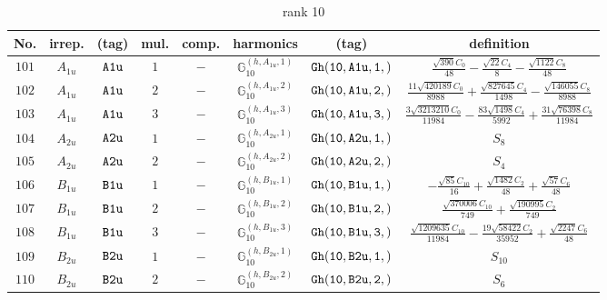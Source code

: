\documentclass[fleqn,8pt]{jsarticle}
\begin{document}
\begin{table}[ht!]
\begin{center}
\caption{rank 10}
\renewcommand{\arraystretch}{1.3}
\begin{tabular}{cccccccc} \hline \hline
No. & irrep. & (tag) & mul. & comp. & harmonics & (tag) & definition \\ \hline
$ 101 $ & $ A_{1u} $ & $ {\tt A1u} $ & $ 1 $ & $ - $ & $ \mathbb{G}_{10}^{(h,A_{1u},1)} $ & $ {\tt Gh(10,A1u,1,)} $ & $ \frac{\sqrt{390} C_{0}}{48} - \frac{\sqrt{22} C_{4}}{8} - \frac{\sqrt{1122} C_{8}}{48} $ \\
$ 102 $ & $ A_{1u} $ & $ {\tt A1u} $ & $ 2 $ & $ - $ & $ \mathbb{G}_{10}^{(h,A_{1u},2)} $ & $ {\tt Gh(10,A1u,2,)} $ & $ \frac{11 \sqrt{420189} C_{0}}{8988} + \frac{\sqrt{827645} C_{4}}{1498} - \frac{\sqrt{146055} C_{8}}{8988} $ \\
$ 103 $ & $ A_{1u} $ & $ {\tt A1u} $ & $ 3 $ & $ - $ & $ \mathbb{G}_{10}^{(h,A_{1u},3)} $ & $ {\tt Gh(10,A1u,3,)} $ & $ \frac{3 \sqrt{3213210} C_{0}}{11984} - \frac{83 \sqrt{1498} C_{4}}{5992} + \frac{31 \sqrt{76398} C_{8}}{11984} $ \\
$ 104 $ & $ A_{2u} $ & $ {\tt A2u} $ & $ 1 $ & $ - $ & $ \mathbb{G}_{10}^{(h,A_{2u},1)} $ & $ {\tt Gh(10,A2u,1,)} $ & $ S_{8} $ \\
$ 105 $ & $ A_{2u} $ & $ {\tt A2u} $ & $ 2 $ & $ - $ & $ \mathbb{G}_{10}^{(h,A_{2u},2)} $ & $ {\tt Gh(10,A2u,2,)} $ & $ S_{4} $ \\
$ 106 $ & $ B_{1u} $ & $ {\tt B1u} $ & $ 1 $ & $ - $ & $ \mathbb{G}_{10}^{(h,B_{1u},1)} $ & $ {\tt Gh(10,B1u,1,)} $ & $ - \frac{\sqrt{85} C_{10}}{16} + \frac{\sqrt{1482} C_{2}}{48} + \frac{\sqrt{57} C_{6}}{48} $ \\
$ 107 $ & $ B_{1u} $ & $ {\tt B1u} $ & $ 2 $ & $ - $ & $ \mathbb{G}_{10}^{(h,B_{1u},2)} $ & $ {\tt Gh(10,B1u,2,)} $ & $ \frac{\sqrt{370006} C_{10}}{749} + \frac{\sqrt{190995} C_{2}}{749} $ \\
$ 108 $ & $ B_{1u} $ & $ {\tt B1u} $ & $ 3 $ & $ - $ & $ \mathbb{G}_{10}^{(h,B_{1u},3)} $ & $ {\tt Gh(10,B1u,3,)} $ & $ \frac{\sqrt{1209635} C_{10}}{11984} - \frac{19 \sqrt{58422} C_{2}}{35952} + \frac{\sqrt{2247} C_{6}}{48} $ \\
$ 109 $ & $ B_{2u} $ & $ {\tt B2u} $ & $ 1 $ & $ - $ & $ \mathbb{G}_{10}^{(h,B_{2u},1)} $ & $ {\tt Gh(10,B2u,1,)} $ & $ S_{10} $ \\
$ 110 $ & $ B_{2u} $ & $ {\tt B2u} $ & $ 2 $ & $ - $ & $ \mathbb{G}_{10}^{(h,B_{2u},2)} $ & $ {\tt Gh(10,B2u,2,)} $ & $ S_{6} $ \\

\end{tabular}
\end{center}
\end{table}
\end{document}
